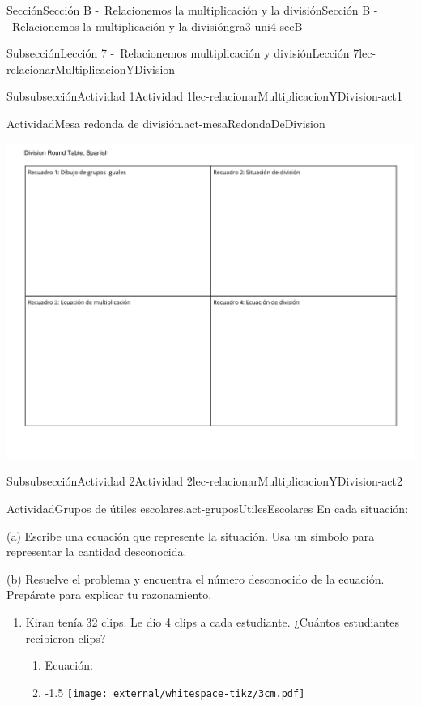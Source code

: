 \begin{sectionptx}{Sección}{Sección B -~Relacionemos la multiplicación y la división}{}{Sección B -~Relacionemos la multiplicación y la división}{}{}{gra3-uni4-secB}
\begin{subsectionptx}{Subsección}{Lección 7 -~Relacionemos multiplicación y división}{}{Lección 7}{}{}{lec-relacionarMultiplicacionYDivision}
\begin{subsubsectionptx}{Subsubsección}{Actividad 1}{}{Actividad 1}{}{}{lec-relacionarMultiplicacionYDivision-act1}
\begin{activity}{Actividad}{Mesa redonda de división.}{act-mesaRedondaDeDivision}
\end{activity}%
\begin{image}{0}{1}{0}{}%
\includegraphics[trim=20 20 20 30, clip, width=1.4\linewidth,angle=90,origin=c]{external/blm/pdf-source/mesa-redonda-de-division.pdf}
\end{image}%
\end{subsubsectionptx}
%
%
\typeout{************************************************}
\typeout{************************************************}
%
\begin{subsubsectionptx}{Subsubsección}{Actividad 2}{}{Actividad 2}{}{}{lec-relacionarMultiplicacionYDivision-act2}
\begin{activity}{Actividad}{Grupos de útiles escolares.}{act-gruposUtilesEscolares}%
En cada situación:%
\par
(a) Escribe una ecuación que represente la situación. Usa un símbolo para representar la cantidad desconocida.%
\par
(b) Resuelve el problema y encuentra el número desconocido de la ecuación. Prepárate para explicar tu razonamiento.%
%
\begin{enumerate}
\item{}Kiran tenía 32 clips. Le dio 4 clips a cada estudiante. ¿Cuántos estudiantes recibieron clips?%
%
\begin{enumerate}
\item{}Ecuación: %
\item{}\begin{image}{0}{1}{0}{-1.5\baselineskip}%
\texttt{[image: external/whitespace-tikz/3cm.pdf]}

\end{image}
\end{enumerate}
\end{enumerate}
\end{activity}
\end{subsubsectionptx}
\end{subsectionptx}
\end{sectionptx}
